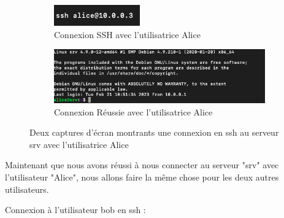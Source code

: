 \documentclass[12pt]{article}
\begin{document}
\begin{figure}[h]
  \centering
  \begin{subfigure}{0.30\textwidth}
    \centering
    \includegraphics[width=\textwidth]{Image-TD-SSH-1/SSH-Alice.png}
    \caption{Connexion SSH avec l'utilisatrice Alice}
  \end{subfigure}
  \vspace{0.9cm} %
  \begin{subfigure}{0.45\textwidth}
    \centering
    \includegraphics[width=\textwidth]{Image-TD-SSH-1/Connexion-SSH-Alice.png}
    \caption{Connexion Réussie avec l'utilisatrice Alice}
  \end{subfigure}
  \caption{Deux captures d'écran montrants une connexion en ssh au serveur srv avec l'utilisatrice Alice}
\end{figure}

\vspace{0.3cm}

Maintenant que nous avons réussi à nous connecter au serveur "srv" avec l'utilisateur "Alice", nous allons faire la même chose pour les deux autres utilisateurs.

\vspace{0.3cm}

\newpage

\vspace{0.3cm}

Connexion à l'utilisateur bob en ssh  : 

\vspace{0.3cm}
\end{document}
